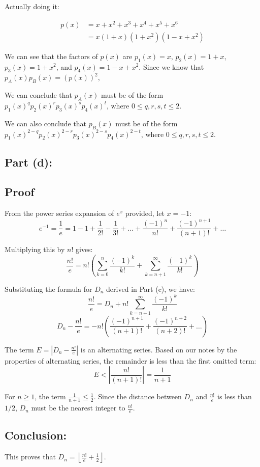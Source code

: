 \documentclass[answers]{exam}
\begin{document}
\begin{questions}
\begin{solution}
			Actually doing it:

			\begin{align*}
				p(x) &= x+x^2+x^3+x^4+x^5+x^6 \\
				&= x(1+x)(1+x^2)(1-x+x^2)
			\end{align*}
		
		
			We can see that the factors of $p(x)$ are $p_1(x) = x$, $p_2(x) = 1+x$, $p_3(x) = 1+x^2$, and $p_4(x) = 1-x+x^2$.  Since we know that $p_A(x)p_B(x) = (p(x))^2$, 
			
			We can conclude that $p_A(x)$ must be of the form $p_1(x)^qp_2(x)^rp_3(x)^sp_4(x)^t$, where $0 \leq q,r,s,t \leq 2$. 
			
			We can also conclude that $p_B(x)$ must be of the form $p_1(x)^{2-q}p_2(x)^{2-r}p_3(x)^{2-s}p_4(x)^{2-t}$, where $0 \leq q,r,s,t \leq 2$.

		
			\subsection*{Part (d):}
\subsection*{Proof}
From the power series expansion of $e^x$ provided, let $x = -1$:
$$e^{-1} = \frac{1}{e} = 1 - 1 + \frac{1}{2!} - \frac{1}{3!} + \dots + \frac{(-1)^n}{n!} + \frac{(-1)^{n+1}}{(n+1)!} + \dots$$

Multiplying this by $n!$ gives:
$$\frac{n!}{e} = n! \left( \sum_{k=0}^n \frac{(-1)^k}{k!} + \sum_{k=n+1}^\infty \frac{(-1)^k}{k!} \right)$$

Substituting the formula for $D_n$ derived in Part (c), we have:
$$\frac{n!}{e} = D_n + n! \sum_{k=n+1}^\infty \frac{(-1)^k}{k!}$$
$$D_n - \frac{n!}{e} = -n! \left( \frac{(-1)^{n+1}}{(n+1)!} + \frac{(-1)^{n+2}}{(n+2)!} + \dots \right)$$

The term $E = \left| D_n - \frac{n!}{e} \right|$ is an alternating series. Based on our notes by the properties of alternating series, the remainder is less than the first omitted term:
$$E < \left| \frac{n!}{(n+1)!} \right| = \frac{1}{n+1}$$

For $n \geq 1$, the term $\frac{1}{n+1} \leq \frac{1}{2}$. Since the distance between $D_n$  and $\frac{n!}{e}$ is less than $1/2$, $D_n$ must be the nearest integer to $\frac{n!}{e}$.

\subsection*{Conclusion:}
This proves that $D_n = \left\lfloor \frac{n!}{e} + \frac{1}{2} \right\rfloor$.



\end{solution}
\end{questions}
\end{document}
